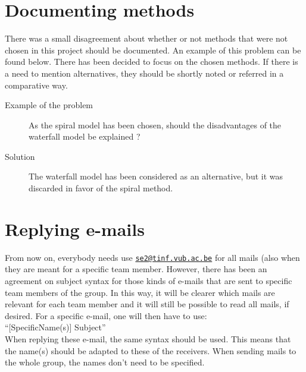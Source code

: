 \documentclass[a4paper, 12pt]{article}
\begin{document}
	\section{Documenting methods}
There was a small disagreement about whether or not methods that were not chosen in this project should be documented. An example of this problem can be found below. There has been decided to focus on the chosen methods. If there is a need to mention alternatives, they should be shortly noted or referred in a comparative way.
	\begin{description}
		\item [Example of the problem] As the spiral model has been chosen, should the disadvantages of the waterfall model be explained ?
		\item [Solution] The waterfall model has been considered as an alternative, but it was discarded in favor of the spiral method.
	\end{description}
	
	\section{Replying e-mails}
From now on, everybody needs use \href{mailto:se2@tinf.vub.ac.be}{\nolinkurl{se2@tinf.vub.ac.be}} for all mails (also when they are meant for a specific team member. However, there has been an agreement on subject syntax for those kinds of e-mails that are sent to specific team members of the group. In this way, it will be clearer which mails are relevant for each team member and it will still be possible to read all mails, if desired.
For a specific e-mail, one will then have to use:\\
``[SpecificName(s)] Subject''\\
When replying these e-mail, the same syntax should be used. This means that the name(s) should be adapted to these of the receivers.
When sending mails to the whole group, the names don't need to be specified.
\end{document}
